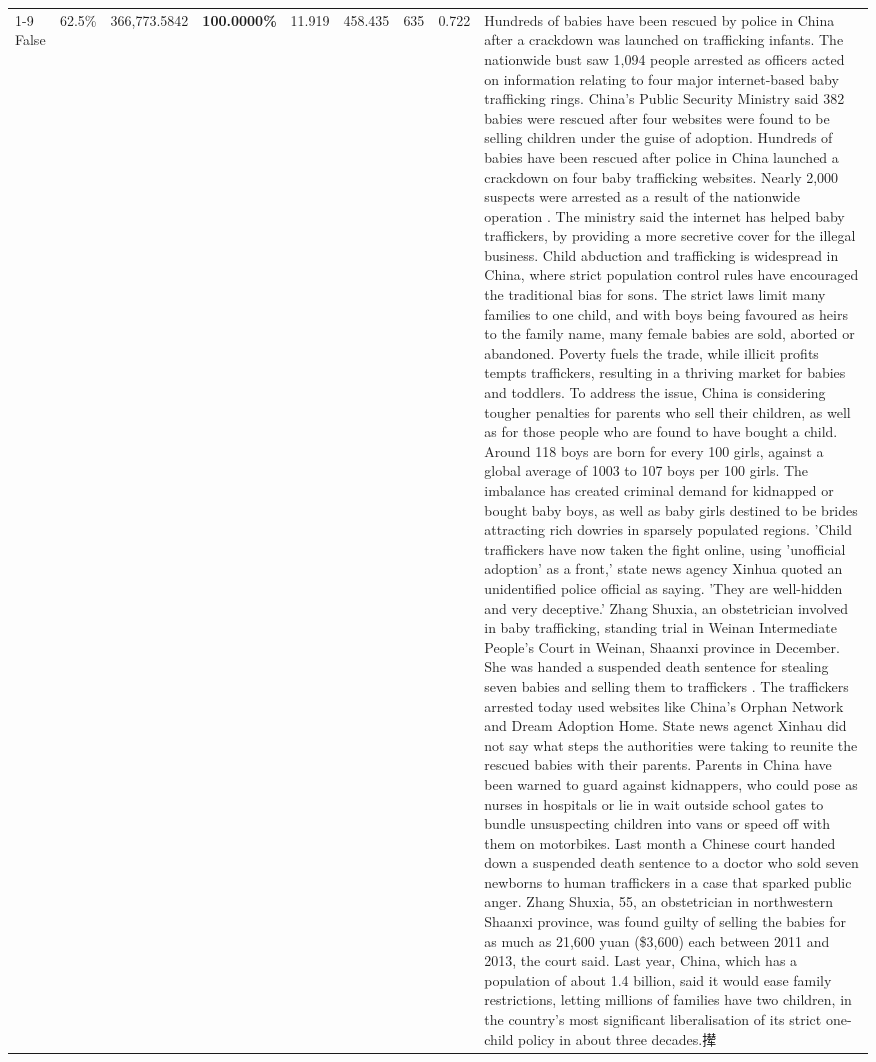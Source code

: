 \begin{table}[H]
\begin{tabular}{lllrlllll}
\cline{1-9}
False & 62.5\% & 366,773.5842 & \bfseries \color{red} 100.0000\% & 11.919 & 458.435 & 635 & 0.722 & Hundreds of babies have been rescued by police in China after a crackdown was launched on trafficking infants. The nationwide bust saw 1,094 people arrested as officers acted on information relating to four major internet-based baby trafficking rings. China's Public Security Ministry said 382 babies were rescued after four websites were found to be selling children under the guise of adoption. Hundreds of babies have been rescued after police in China launched a crackdown on four baby trafficking websites. Nearly 2,000 suspects were arrested as a result of the nationwide operation . The ministry said the internet has helped baby traffickers, by providing a more secretive cover for the illegal business. Child abduction and trafficking is widespread in China, where strict population control rules have encouraged the traditional bias for sons. The strict laws limit many families to one child, and with boys being favoured as heirs to the family name, many female babies are sold, aborted or abandoned. Poverty fuels the trade, while illicit profits tempts traffickers, resulting in a thriving market for babies and toddlers. To address the issue, China is considering tougher penalties for parents who sell their children, as well as for those people who are found to have bought a child. Around 118 boys are born for every 100 girls, against a global average of 1003 to 107 boys per 100 girls. The imbalance has created criminal demand for kidnapped or bought baby boys, as well as baby girls destined to be brides attracting rich dowries in sparsely populated regions. 'Child traffickers have now taken the fight online, using 'unofficial adoption' as a front,' state news agency Xinhua quoted an unidentified police official as saying. 'They are well-hidden and very deceptive.' Zhang Shuxia, an obstetrician involved in baby trafficking, standing trial in Weinan Intermediate People's Court in Weinan, Shaanxi province in December. She was handed a suspended death sentence for stealing seven babies and selling them to traffickers . The traffickers arrested today used websites like China's Orphan Network and Dream Adoption Home. State news agenct Xinhau did not say what steps the authorities were taking to reunite the rescued babies with their parents. Parents in China have been warned to guard against kidnappers, who could pose as nurses in hospitals or lie in wait outside school gates to bundle unsuspecting children into vans or speed off with them on motorbikes. Last month a Chinese court handed down a suspended death sentence to a doctor who sold seven newborns to human traffickers in a case that sparked public anger. Zhang Shuxia, 55, an obstetrician in northwestern Shaanxi province, was found guilty of selling the babies for as much as 21,600 yuan (\$3,600) each between 2011 and 2013, the court said. Last year, China, which has a population of about 1.4 billion, said it would ease family restrictions, letting millions of families have two children, in the country's most significant liberalisation of its strict one-child policy in about three decades.撵 \\

\end{tabular}
\end{table}
